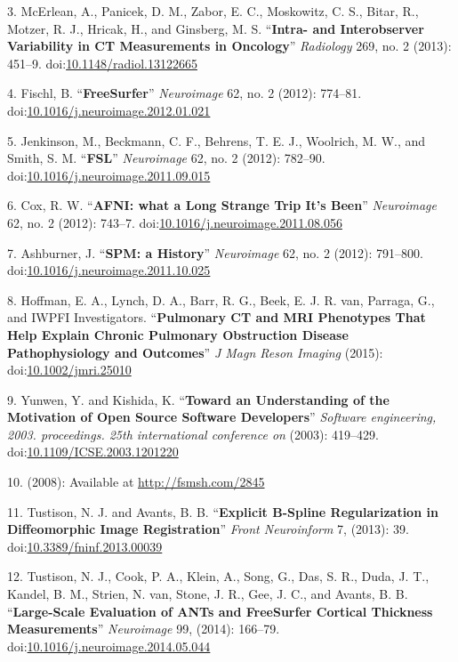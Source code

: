 \documentclass[11pt,]{article}
\begin{document}
3. McErlean, A., Panicek, D. M., Zabor, E. C., Moskowitz, C. S., Bitar,
R., Motzer, R. J., Hricak, H., and Ginsberg, M. S. ``\textbf{Intra- and
Interobserver Variability in CT Measurements in Oncology}''
\emph{Radiology} 269, no. 2 (2013): 451--9.
doi:\href{http://dx.doi.org/10.1148/radiol.13122665}{10.1148/radiol.13122665}

4. Fischl, B. ``\textbf{FreeSurfer}'' \emph{Neuroimage} 62, no. 2
(2012): 774--81.
doi:\href{http://dx.doi.org/10.1016/j.neuroimage.2012.01.021}{10.1016/j.neuroimage.2012.01.021}

5. Jenkinson, M., Beckmann, C. F., Behrens, T. E. J., Woolrich, M. W.,
and Smith, S. M. ``\textbf{FSL}'' \emph{Neuroimage} 62, no. 2 (2012):
782--90.
doi:\href{http://dx.doi.org/10.1016/j.neuroimage.2011.09.015}{10.1016/j.neuroimage.2011.09.015}

6. Cox, R. W. ``\textbf{AFNI: what a Long Strange Trip It's Been}''
\emph{Neuroimage} 62, no. 2 (2012): 743--7.
doi:\href{http://dx.doi.org/10.1016/j.neuroimage.2011.08.056}{10.1016/j.neuroimage.2011.08.056}

7. Ashburner, J. ``\textbf{SPM: a History}'' \emph{Neuroimage} 62, no. 2
(2012): 791--800.
doi:\href{http://dx.doi.org/10.1016/j.neuroimage.2011.10.025}{10.1016/j.neuroimage.2011.10.025}

8. Hoffman, E. A., Lynch, D. A., Barr, R. G., Beek, E. J. R. van,
Parraga, G., and IWPFI Investigators. ``\textbf{Pulmonary CT and MRI
Phenotypes That Help Explain Chronic Pulmonary Obstruction Disease
Pathophysiology and Outcomes}'' \emph{J Magn Reson Imaging} (2015):
doi:\href{http://dx.doi.org/10.1002/jmri.25010}{10.1002/jmri.25010}

9. Yunwen, Y. and Kishida, K. ``\textbf{Toward an Understanding of the
Motivation of Open Source Software Developers}'' \emph{Software
engineering, 2003. proceedings. 25th international conference on}
(2003): 419--429.
doi:\href{http://dx.doi.org/10.1109/ICSE.2003.1201220}{10.1109/ICSE.2003.1201220}

10. (2008): Available at \url{http://fsmsh.com/2845}

11. Tustison, N. J. and Avants, B. B. ``\textbf{Explicit B-Spline
Regularization in Diffeomorphic Image Registration}'' \emph{Front
Neuroinform} 7, (2013): 39.
doi:\href{http://dx.doi.org/10.3389/fninf.2013.00039}{10.3389/fninf.2013.00039}

12. Tustison, N. J., Cook, P. A., Klein, A., Song, G., Das, S. R., Duda,
J. T., Kandel, B. M., Strien, N. van, Stone, J. R., Gee, J. C., and
Avants, B. B. ``\textbf{Large-Scale Evaluation of ANTs and FreeSurfer
Cortical Thickness Measurements}'' \emph{Neuroimage} 99, (2014):
166--79.
doi:\href{http://dx.doi.org/10.1016/j.neuroimage.2014.05.044}{10.1016/j.neuroimage.2014.05.044}
\end{document}
